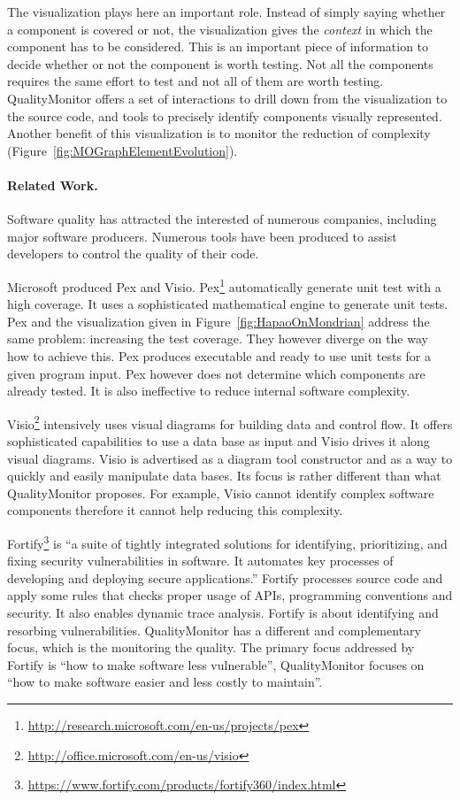 \documentclass[runningheads]{llncs}
\newcommand{\figref}[1]{Figure~\ref{fig:#1}}
\begin{document}
The visualization plays here an important role. Instead of simply saying whether a component is covered or not, the visualization gives the \emph{context} in which the component has to be considered. This is an important piece of information to decide whether or not the component is worth testing. Not all the components requires the same effort to test and not all of them are worth testing. QualityMonitor offers a set of interactions to drill down from the visualization to the source code, and tools to precisely identify components visually represented. Another benefit of this visualization is to monitor the reduction of complexity (\figref{MOGraphElementEvolution}).


\paragraph{Related Work.}
Software quality has attracted the interested of numerous companies, including major software producers. 
Numerous tools have been produced to assist developers to control the quality of their code. 

Microsoft produced Pex and Visio. 
Pex\footnote{\url{http://research.microsoft.com/en-us/projects/pex}} automatically generate unit test with a high coverage. It uses a sophisticated mathematical engine to generate unit tests. Pex and the visualization given in \figref{HapaoOnMondrian} address the same problem: increasing the test coverage. They however diverge on the way how to achieve this. Pex produces executable and ready to use unit tests for a given program input. Pex however does not determine which components are already tested. It is also ineffective to reduce internal software complexity.

Visio\footnote{\url{http://office.microsoft.com/en-us/visio}} intensively uses visual diagrams for building data and control flow. It offers sophisticated capabilities to use a data base as input and Visio drives it along visual diagrams. Visio is advertised as a diagram tool constructor and as a way to quickly and easily manipulate data bases. Its focus is rather different than what QualityMonitor proposes. For example, Visio cannot identify complex software components therefore it cannot help reducing this complexity.

Fortify\footnote{\url{https://www.fortify.com/products/fortify360/index.html}} is ``a suite of tightly integrated solutions for identifying, prioritizing, and fixing security vulnerabilities in software. It automates key processes of developing and deploying secure applications.'' Fortify processes source code and apply some rules that checks proper usage of APIs, programming conventions and security. It also enables dynamic trace analysis. Fortify is about identifying and resorbing vulnerabilities. QualityMonitor has a different and complementary focus, which is the monitoring the quality. The primary focus addressed by Fortify is ``how to make software less vulnerable'', QualityMonitor focuses on ``how to make software easier and less costly to maintain''.
\end{document}
